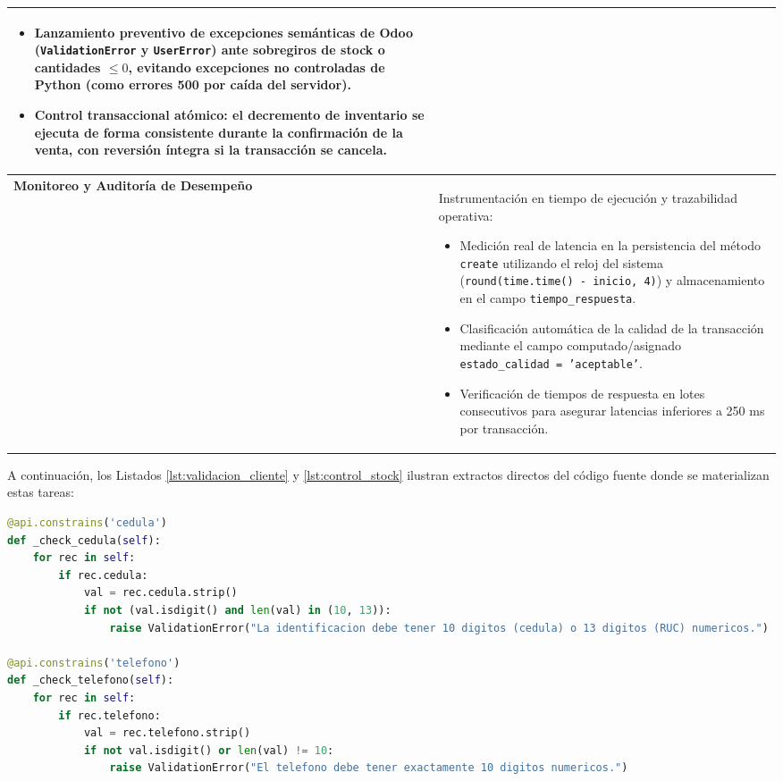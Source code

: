 \documentclass{article}
\begin{document}
\begin{table}[H]
\begin{tabularx}{\textwidth}{p{3.8cm}X}
\begin{itemize}
    \item Lanzamiento preventivo de excepciones semánticas de Odoo (\texttt{ValidationError} y \texttt{UserError}) ante sobregiros de stock o cantidades $\le 0$, evitando excepciones no controladas de Python (como errores 500 por caída del servidor).
    \item Control transaccional atómico: el decremento de inventario se ejecuta de forma consistente durante la confirmación de la venta, con reversión íntegra si la transacción se cancela.
\end{itemize} \\
\midrule
\textbf{Monitoreo y Auditoría de Desempeño} & 
Instrumentación en tiempo de ejecución y trazabilidad operativa:
\begin{itemize}
    \item Medición real de latencia en la persistencia del método \texttt{create} utilizando el reloj del sistema (\texttt{round(time.time() - inicio, 4)}) y almacenamiento en el campo \texttt{tiempo\_respuesta}.
    \item Clasificación automática de la calidad de la transacción mediante el campo computado/asignado \texttt{estado\_calidad = 'aceptable'}.
    \item Verificación de tiempos de respuesta en lotes consecutivos para asegurar latencias inferiores a 250 ms por transacción.
\end{itemize} \\
\bottomrule
\end{tabularx}
\end{table}

A continuación, los Listados \ref{lst:validacion_cliente} y \ref{lst:control_stock} ilustran extractos directos del código fuente donde se materializan estas tareas:

\begin{lstlisting}[language=Python, caption={Tarea ACS: Validación preventiva de datos en \texttt{models/customer.py}}, label={lst:validacion_cliente}]
@api.constrains('cedula')
def _check_cedula(self):
    for rec in self:
        if rec.cedula:
            val = rec.cedula.strip()
            if not (val.isdigit() and len(val) in (10, 13)):
                raise ValidationError("La identificacion debe tener 10 digitos (cedula) o 13 digitos (RUC) numericos.")

@api.constrains('telefono')
def _check_telefono(self):
    for rec in self:
        if rec.telefono:
            val = rec.telefono.strip()
            if not val.isdigit() or len(val) != 10:
                raise ValidationError("El telefono debe tener exactamente 10 digitos numericos.")
\end{lstlisting}
\end{document}
